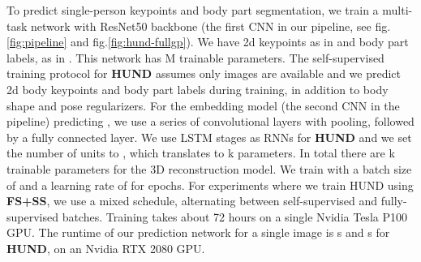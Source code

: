 \documentclass[final]{cvpr}
\begin{document}
 To predict single-person keypoints and body part segmentation, we train a multi-task network with ResNet50 \cite{he2016identity} backbone (the first CNN in our pipeline, see fig.\ref{fig:pipeline} and fig.\ref{fig:hund-fullgp})\cite{dmhs_cvpr17}.
We have  2d keypoints as in \cite{cao2019openpose} and  body part labels, as in \cite{Guler2018DensePose}. This network has M trainable parameters.
The self-supervised training protocol for \textbf{HUND} assumes only images are available and we predict 2d body keypoints and body part labels during training, in addition to body shape and pose regularizers. For the embedding model (the second CNN in the pipeline) predicting , we use a series of  convolutional layers with pooling, followed by a fully connected layer. We use  LSTM \cite{hochreiter1997long} stages as RNNs for \textbf{HUND} and we set the number of units to , which translates to k parameters. In total there are k trainable parameters for the 3D reconstruction model. We train with a batch size of  and a learning rate of  for  epochs. For experiments where we train HUND using {\bf FS+SS}, we use a mixed schedule, alternating between self-supervised and fully-supervised batches. Training takes about 72 hours on a single Nvidia Tesla P100 GPU. The runtime of our prediction network for a single image is s and s for \textbf{HUND}, on an Nvidia RTX 2080 GPU.  
\end{document}

